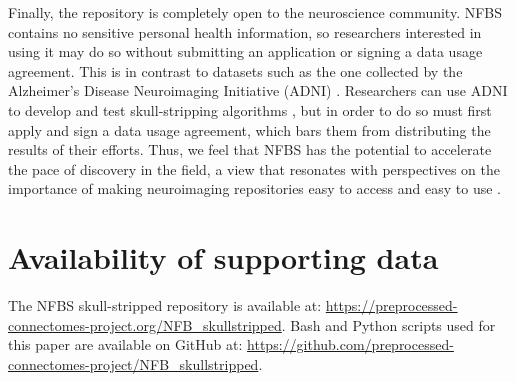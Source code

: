 Finally, the repository is completely open to the neuroscience community. NFBS contains no sensitive personal health information, so researchers interested in using it may do so without submitting an application or signing a data usage agreement. This is in contrast to datasets such as the one collected by the Alzheimer's Disease Neuroimaging Initiative (ADNI) \cite{pmid17476317}. Researchers can use ADNI to develop and test skull-stripping algorithms \cite{pmid21195780}, but in order to do so must first apply and sign a data usage agreement, which bars them from distributing the results of their efforts. Thus, we feel that NFBS has the potential to accelerate the pace of discovery in the field, a view that resonates with perspectives on the importance of making neuroimaging repositories easy to access and easy to use \cite{Nichols054262}.

\section*{Availability of supporting data}
The NFBS skull-stripped repository is available at: \url{https://preprocessed-connectomes-project.org/NFB\_skullstripped}. Bash and Python scripts used for this paper are available on GitHub at: \url{https://github.com/preprocessed-connectomes-project/NFB\_skullstripped}.
